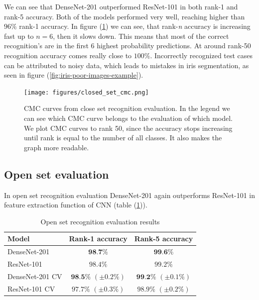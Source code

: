\documentclass[9pt]{IEEEtran}
\begin{document}
We can see that DenseNet-201 outperformed ResNet-101 in both rank-1 and rank-5 accuracy. Both of the models performed very well, reaching higher than $96\%$ rank-1 accuracy. In figure (\ref{fig:closed-set-cmc}) we can see, that rank-\textit{n} accuracy is increasing fast up to $\textit{n} = 6$, then it slows down. This means that most of the correct recognition's are in the first 6 highest probability predictions. At around rank-50 recognition accuracy comes really close to $100\%$. Incorrectly recognized test cases can be attributed to noisy data, which leads to mistakes in iris segmentation, as seen in figure (\ref{fig:iris-poor-images-example}).

\begin{figure}[h]
    \centering
    \texttt{[image: figures/closed\_set\_cmc.png]}
    \caption{CMC curves from close set recognition evaluation. In the legend we can see which CMC curve belongs to the evaluation of which model. We plot CMC curves to rank 50, since the accuracy stops increasing until rank is equal to the number of all classes. It also makes the graph more readable.}
    \label{fig:closed-set-cmc}
\end{figure}

\subsection{Open set evaluation}

In open set recognition evaluation DenseNet-201 again outperforms ResNet-101 in feature extraction function of CNN (table (\ref{tab:results-open})). 

\begin{table}[h]
    \centering
    \caption{Open set recognition evaluation results}
    \def\arraystretch{1.3}
    \begin{tabular}{ l | c | c} 
        
        Model & Rank-1 accuracy & Rank-5 accuracy \\
        \hline
        DenseNet-201 & $\textbf{98.7\%}$ & $\textbf{99.6\%}$\\
        ResNet-101 & $98.4\%$ & $99.2\%$\\
        \hline
        DenseNet-201 CV & $\textbf{98.5\%}$ $(\pm0.2\%)$ & $\textbf{99.2\%}$ $(\pm0.1\%)$\\
        ResNet-101 CV & $97.7\%$ $(\pm0.3\%)$ & $98.9\%$ $(\pm0.2\%)$ \\
        
    \end{tabular}
    \label{tab:results-open}
\end{table}
\end{document}
